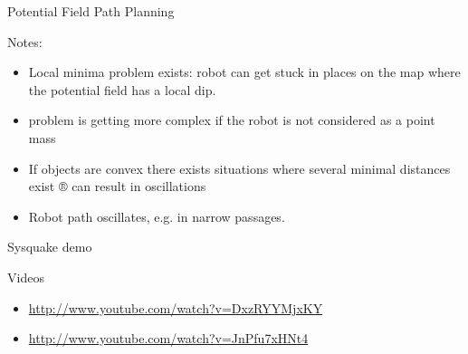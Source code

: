 \documentclass[compress]{beamer}
\begin{document}
\begin{frame}{Potential Field Path Planning}

Notes:

\begin{itemize}
\item Local minima problem exists: robot can get stuck in places on the map
  where the potential field has a local dip.
\item problem is getting more complex if the robot is not considered as a
  point mass
\item If objects are convex there exists situations where several minimal
  distances exist ® can result in oscillations
\item Robot path oscillates, e.g. in narrow passages.
\end{itemize}

Sysquake demo

Videos

\begin{itemize}
\item \url{http://www.youtube.com/watch?v=DxzRYYMjxKY}
\item \url{http://www.youtube.com/watch?v=JnPfu7xHNt4}
\end{itemize}

\end{frame}
\end{document}
